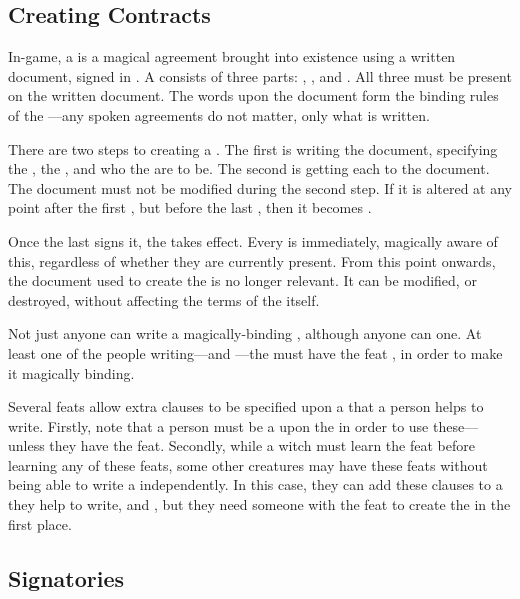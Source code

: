 \subsection{Creating Contracts}

In-game, a {\contract} is a magical agreement brought into existence using a written document, signed in .
A {\contract} consists of three parts: {\stipulations}, {\penalties}, and {\signatories}.
All three must be present on the written document.
The words upon the document form the binding rules of the {\contract}---any spoken agreements do not matter, only what is written.

There are two steps to creating a {\contract}.
The first is writing the document, specifying the {\stipulations}, the {\penalties}, and who the {\signatories} are to be.
The second is getting each {\signatory} to {\sign} the document.
The document must not be modified during the second step.
If it is altered at any point after the first {\signatory} {\signs}, but before the last {\signatory} {\signs}, then it becomes {\void}.

Once the last {\signatory} signs it, the {\contract} takes effect.
Every {\signatory} is immediately, magically aware of this, regardless of whether they are currently present.
From this point onwards, the document used to create the {\contract} is no longer relevant.
It can be modified, or destroyed, without affecting the terms of the {\contract} itself.

Not just anyone can write a magically-binding {\contract}, although anyone can {\sign} one.
At least one of the people writing---and {\signing}---the {\contract} must have the feat , in order to make it magically binding.

Several feats allow extra clauses to be specified upon a {\contract} that a person helps to write.
Firstly, note that a person must be a {\signatory} upon the {\contract} in order to use these---unless they have the  feat.
Secondly, while a witch must learn the feat  before learning any of these feats, some other creatures may have these feats without being able to write a {\contract} independently. %
In this case, they can add these clauses to a {\contract} they help to write, and {\sign}, but they need someone with the  feat to create the {\contract} in the first place.

\subsection{Signatories}

